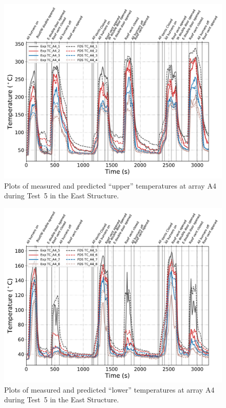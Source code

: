 \clearpage
\begin{figure}[p]
	\centering
	\includegraphics[width=\columnwidth]{Figures/Plots/Validation/Temperature/Test_5_TC_A4_upper}
	\caption{Plots of measured and predicted ``upper'' temperatures at array A4 during Test~5 in the East Structure.}
	\label{fig:TCA4_upper_data_Test5}
\end{figure}
\clearpage
\begin{figure}[p]
	\centering
	\includegraphics[width=\columnwidth]{Figures/Plots/Validation/Temperature/Test_5_TC_A4_lower}
	\caption{Plots of measured and predicted ``lower'' temperatures at array A4 during Test~5 in the East Structure.}
	\label{fig:TCA4_lower_data_Test5}
\end{figure}

